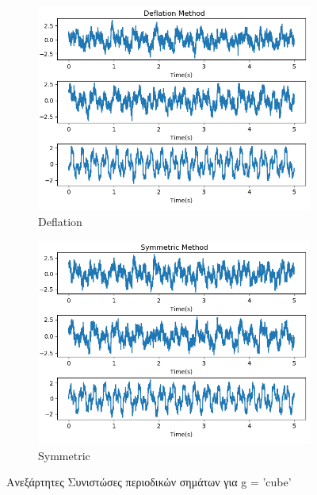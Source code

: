 \begin{figure}[H]
    \centering
    \begin{subfigure}{0.48 \textwidth}
        \centering
       \includegraphics[width=\textwidth]{fwto/Deflation_ica_1_cube.png}\en
        \caption{Deflation} \gr
        \label{fig:5.4a}
    \end{subfigure}%
    \begin{subfigure}{0.48 \textwidth}
        \centering
       \includegraphics[width=\textwidth]{fwto/Symmetric_ica_1_cube.png}
        \en
        \caption{Symmetric} \gr
        \label{fig:5.4b}
    \end{subfigure}%
    \gr
    \caption{Ανεξάρτητες Συνιστώσες περιοδικών σημάτων για \en g = 'cube' \gr}
\end{figure}
